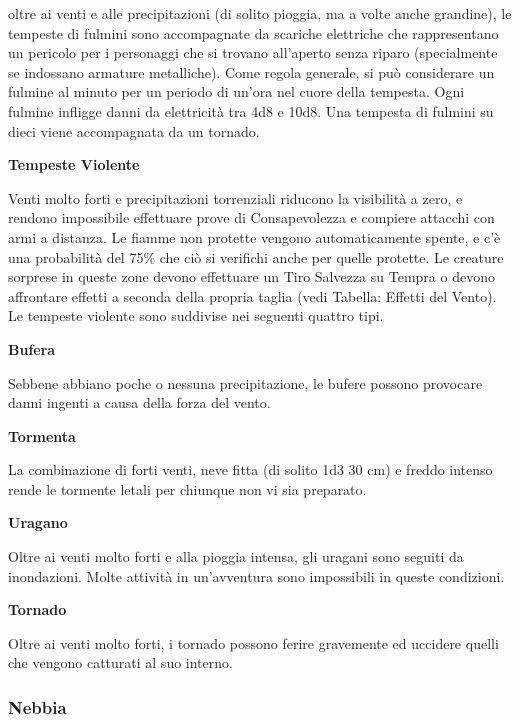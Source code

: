 \begin{multicols}{2}
oltre ai venti e alle precipitazioni (di solito pioggia, ma a volte anche grandine), le tempeste di fulmini sono accompagnate da scariche elettriche che rappresentano un pericolo per i personaggi che si trovano all'aperto senza riparo (specialmente se indossano armature metalliche). Come regola generale, si può considerare un fulmine al minuto per un periodo di un'ora nel cuore della tempesta. Ogni fulmine infligge danni da elettricità tra 4d8 e 10d8. Una tempesta di fulmini su dieci viene accompagnata da un tornado.

\textbf{Tempeste Violente}

Venti molto forti e precipitazioni torrenziali riducono la visibilità a zero, e rendono impossibile effettuare prove di Consapevolezza e compiere attacchi con armi a distanza. Le fiamme non protette vengono automaticamente spente, e c'è una probabilità del 75\% che ciò si verifichi anche per quelle protette. Le creature sorprese in queste zone devono effettuare un Tiro Salvezza su Tempra o devono affrontare effetti a seconda della propria taglia (vedi Tabella: Effetti del Vento). Le tempeste violente sono suddivise nei seguenti quattro tipi.




\textbf{Bufera}

Sebbene abbiano poche o nessuna precipitazione, le bufere possono provocare danni ingenti a causa della forza del vento.

\textbf{Tormenta}

La combinazione di forti venti, neve fitta (di solito 1d3 \texttimes{} 30 cm) e freddo intenso rende le tormente letali per chiunque non vi sia preparato.

\textbf{Uragano}

Oltre ai venti molto forti e alla pioggia intensa, gli uragani sono seguiti da inondazioni. Molte attività in un'avventura sono impossibili in queste condizioni.

\textbf{Tornado}

Oltre ai venti molto forti, i tornado possono ferire gravemente ed uccidere quelli che vengono catturati al suo interno.

\subsubsection{Nebbia}


\end{multicols}
